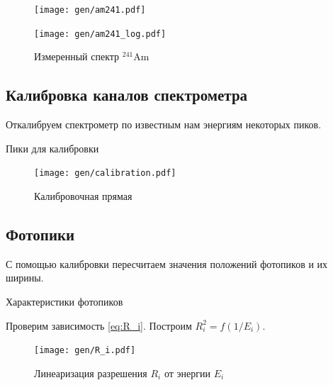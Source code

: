 \documentclass[12pt,a4paper]{article}
\begin{document}
	
					
	\begin{figure}[H]
		\centering
		\begin{minipage}{0.5\textwidth}
			\centering
			\texttt{[image: gen/am241.pdf]}
		\end{minipage}%
		\begin{minipage}{0.5\textwidth}
			\centering
			\texttt{[image: gen/am241\_log.pdf]}
		\end{minipage}
		\caption{Измеренный спектр $^{241}$Am}
		\label{fig:am_spectrum}
	\end{figure}
		
	\subsection*{Калибровка каналов спектрометра}
	
	Откалибруем спектрометр по известным нам энергиям некоторых пиков.
	
	\begin{table}[H]
		
		\caption{Пики для калибровки}
	\end{table}
	
	\begin{figure}[H]
		\centering
		\texttt{[image: gen/calibration.pdf]}
		\caption{Калибровочная прямая}
		\label{fig:calibration}
	\end{figure}
	
	\subsection*{Фотопики}
	С помощью калибровки пересчитаем значения положений фотопиков и их ширины.

	\begin{table}[H]
		
		\caption{Характеристики фотопиков}
	\end{table}
	
	Проверим зависимость \eqref{eq:R_i}. Построим $R_i^2 = f(1/E_i)$.
	
	\begin{figure}[H]
		\centering
		\texttt{[image: gen/R\_i.pdf]}
		\caption{Линеаризация разрешения $R_i$ от энергии $E_i$}
		\label{fig:R_i}
	\end{figure}
	
\end{document}
